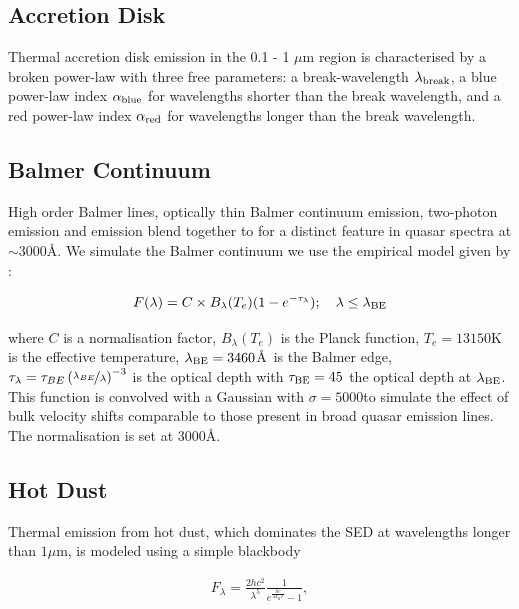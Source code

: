 \subsection{Accretion Disk}

Thermal accretion disk emission in the 0.1 - 1 $\mu$m region is characterised by a broken power-law with three free parameters: a break-wavelength $\lambda_{\rm break}$, a blue power-law index $\alpha_{\rm blue}$ for wavelengths shorter than the break wavelength, and a red power-law index $\alpha_{\rm red}$ for wavelengths longer than the break wavelength.

\subsection{Balmer Continuum}

High order Balmer lines, optically thin Balmer continuum emission, two-photon emission and  emission blend together to for a distinct feature in quasar spectra at $\sim3000$\AA. 
We simulate the Balmer continuum we use the empirical model given by \citet{grandi82}: 

\begin{equation}
  F(\lambda) = C \times B_\lambda(T_e)(1-e^{-\tau_\lambda}); \quad \lambda \leq \lambda_{\rm BE}
\end{equation}

where $C$ is a normalisation factor, $B_\lambda(T_e)$ is the Planck function, $T_e=13150$K is the effective temperature, $\lambda_{\rm BE}=3460$\AA\, is the Balmer edge, $\tau_\lambda = \tau_{BE}\left( \nicefrac{\lambda_{BE}} {\lambda} \right)^{-3}$ is the optical depth with $\tau_{\rm BE}=45$ the optical depth at $\lambda_{\rm BE}$. 
This function is convolved with a Gaussian with $\sigma=5000$\kms to simulate the effect of bulk velocity shifts comparable to those present in broad quasar emission lines. 
The normalisation is set at 3000\AA. 

\subsection{Hot Dust}

Thermal emission from hot dust, which dominates the \ac{SED} at wavelengths longer than $1\mu$m, is modeled using a simple blackbody

\begin{eqnarray}  
  F_\lambda =\frac{2 hc^2}{\lambda^5}\frac{1}{ e^{\frac{hc}{\lambda k_\mathrm{B}T}} - 1}, 
\end{eqnarray}

